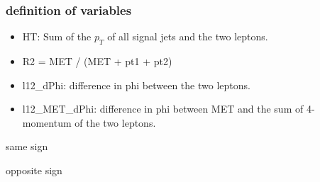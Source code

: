\documentclass[mathserif,serif]{beamer}
\begin{document}
\begin{frame}
\frametitle{definition of variables}
\normalsize
\begin{itemize}
\item HT: Sum of the $p_T$ of all signal jets and the two leptons.
\item R2 = MET / (MET + pt1 + pt2)
\item l12\_dPhi: difference in phi between the two leptons.
\item l12\_MET\_dPhi: difference in phi between MET and the sum of 4-momentum of the two leptons.
\end{itemize}
\end{frame}

\begin{frame}
\begin{center}
\huge
same sign
\end{center}
\end{frame}

\def \PathToPlot {../plot}


\begin{frame}
\begin{center}
\huge
opposite sign
\end{center}
\end{frame}

\def \PathToPlot {../plot}

\end{document}
